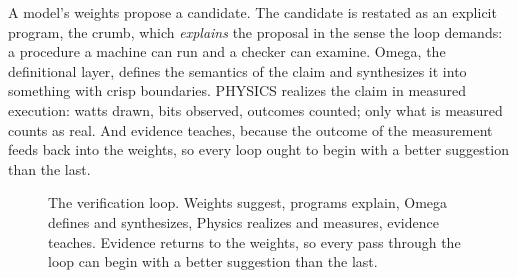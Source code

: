 \documentclass[11pt]{article}
\begin{document}
A model's weights propose a candidate. The candidate is restated as an
explicit program, the crumb, which \emph{explains} the proposal in the
sense the loop demands: a procedure a machine can run and a checker
can examine. Omega, the definitional layer, defines the semantics of
the claim and synthesizes it into something with crisp boundaries.
PHYSICS realizes the claim in measured execution: watts drawn, bits
observed, outcomes counted; only what is measured counts as real. And
evidence teaches, because the outcome of the
measurement feeds back into the weights, so every loop ought to begin
with a better suggestion than the last.

\begin{figure}[H]
\centering
{}
\caption{The verification loop. Weights suggest, programs explain,
Omega defines and synthesizes, Physics realizes and measures,
evidence teaches. Evidence
returns to the weights, so every pass through the loop can begin with
a better suggestion than the last.}
\label{fig:loop}
\end{figure}
\end{document}
